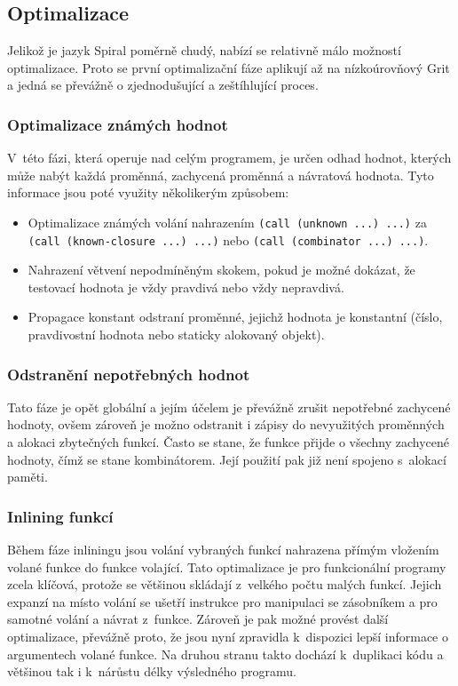 \subsection{Optimalizace}

Jelikož je jazyk Spiral poměrně chudý, nabízí se relativně málo možností
optimalizace. Proto se první optimalizační fáze aplikují až na nízkoúrovňový
Grit a jedná se převážně o zjednodušující a zeštíhlující proces.

\subsubsection{Optimalizace známých hodnot}

V~této fázi, která operuje nad celým programem, je určen odhad hodnot, kterých
může nabýt každá proměnná, zachycená proměnná a návratová hodnota. Tyto
informace jsou poté využity několikerým způsobem:

\begin{itemize}
  \item Optimalizace známých volání nahrazením \texttt{(call (unknown ...) ...)}
    za \texttt{(call (known-closure ...) ...)} nebo \texttt{(call (combinator
    ...) ...)}.
  \item Nahrazení větvení nepodmíněným skokem, pokud je možné dokázat, že
    testovací hodnota je vždy pravdivá nebo vždy nepravdivá.
  \item Propagace konstant odstraní proměnné, jejichž hodnota je konstantní
    (číslo, pravdivostní hodnota nebo staticky alokovaný objekt).
\end{itemize}

\subsubsection{Odstranění nepotřebných hodnot}

Tato fáze je opět globální a jejím účelem je převážně zrušit nepotřebné
zachycené hodnoty, ovšem zároveň je možno odstranit i zápisy do nevyužitých
proměnných a alokaci zbytečných funkcí. Často se stane, že funkce přijde o
všechny zachycené hodnoty, čímž se stane kombinátorem. Její použití pak již není
spojeno s~alokací paměti.

\subsubsection{Inlining funkcí}

Během fáze inliningu jsou volání vybraných funkcí nahrazena přímým vložením
volané funkce do funkce volající. Tato optimalizace je pro funkcionální programy
zcela klíčová, protože se většinou skládají z~velkého počtu malých funkcí.
Jejich expanzí na místo volání se ušetří instrukce pro manipulaci se zásobníkem
a pro samotné volání a návrat z~funkce. Zároveň je pak možné provést další
optimalizace, převážně proto, že jsou nyní zpravidla k~dispozici lepší informace
o argumentech volané funkce. Na druhou stranu takto dochází k~duplikaci kódu a
většinou tak i k~nárůstu délky výsledného programu.

